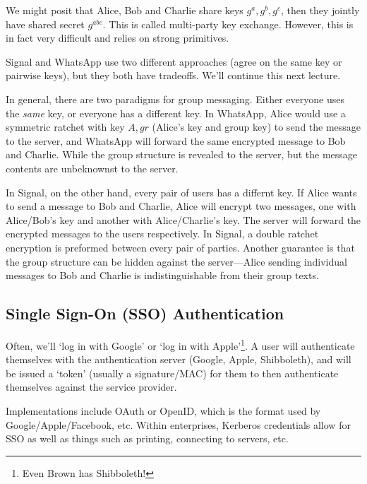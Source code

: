 We might posit that Alice, Bob and Charlie share keys $g^a, g^b, g^c$, then they jointly have shared secret $g^{abc}$. This is called multi-party key exchange. However, this is in fact very difficult and relies on strong primitives.

Signal and WhatsApp use two different approaches (agree on the same key or pairwise keys), but they both have tradeoffs. We'll continue this next lecture.

In general, there are two paradigms for group messaging. Either everyone uses the \emph{same} key, or everyone has a different key. In WhatsApp, Alice would use a symmetric ratchet with key $A, gr$ (Alice's key and group key) to send the message to the server, and WhatsApp will forward the same encrypted message to Bob and Charlie. While the group structure is revealed to the server, but the message contents are unbeknownst to the server.


In Signal, on the other hand, every pair of users has a differnt key. If Alice wants to send a message to Bob and Charlie, Alice will encrypt two messages, one with Alice/Bob's key and another with Alice/Charlie's key. The server will forward the encrypted messages to the users respectively. In Signal, a double ratchet encryption is preformed between every pair of parties. Another guarantee is that the group structure can be hidden against the server---Alice sending individual messages to Bob and Charlie is indistinguishable from their group texts.



\subsection{Single Sign-On (SSO) Authentication}
Often, we'll `log in with Google' or `log in with Apple'\footnote{Even Brown has Shibboleth!}. A user will authenticate themselves with the authentication server (Google, Apple, Shibboleth), and will be issued a `token' (usually a signature/MAC) for them to then authenticate themselves against the service provider.

Implementations include OAuth or OpenID, which is the format used by Google/Apple/Facebook, etc. Within enterprises, Kerberos credentials allow for SSO as well as things such as printing, connecting to servers, etc.


